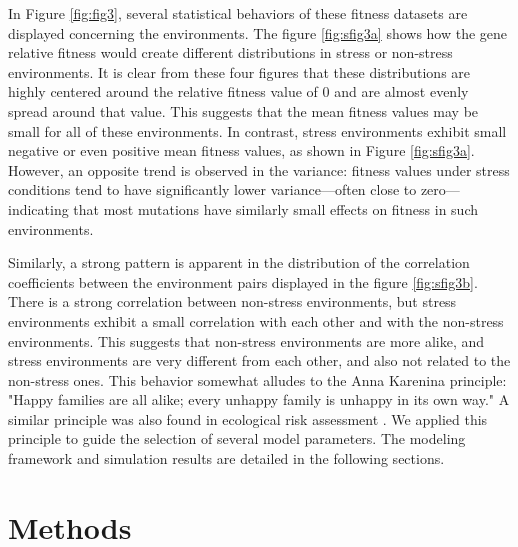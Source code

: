 \documentclass[11pt]{article}
\begin{document}
In Figure \ref{fig:fig3}, several statistical behaviors of these fitness datasets are displayed concerning the environments. The figure \ref{fig:sfig3a} shows how the gene relative fitness would create different distributions in stress or non-stress environments. It is clear from these four figures that these distributions are highly centered around the relative fitness value of 0 and are almost evenly spread around that value. This suggests that the mean fitness values may be small for all of these environments. In contrast, stress environments exhibit small negative or even positive mean fitness values, as shown in Figure \ref{fig:sfig3a}. However, an opposite trend is observed in the variance: fitness values under stress conditions tend to have significantly lower variance—often close to zero—indicating that most mutations have similarly small effects on fitness in such environments.

Similarly, a strong pattern is apparent in the distribution of the correlation coefficients between the environment pairs displayed in the figure \ref{fig:sfig3b}. There is a strong correlation between non-stress environments, but stress environments exhibit a small correlation with each other and with the non-stress environments. This suggests that non-stress environments are more alike, and stress environments are very different from each other, and also not related to the non-stress ones. This behavior somewhat alludes to the Anna Karenina principle: "Happy families are all alike; every unhappy family is unhappy in its own way." A similar principle was also found in ecological risk assessment \cite{moore2001anna}. We applied this principle to guide the selection of several model parameters. The modeling framework and simulation results are detailed in the following sections.


\section{Methods}
\end{document}
